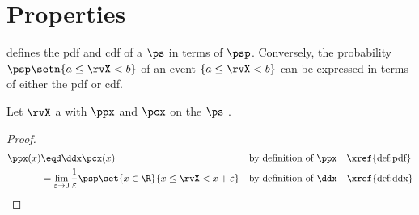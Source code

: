 \section{Properties}
 defines the pdf and cdf of a 
$\ps$ in terms of  $\psp$.
Conversely, the probability  $\psp\setn{a\le\rvX<b}$
of an event $\{a\le\rvX<b\}$ can be
expressed in terms of either the pdf or cdf.

\begin{proposition}
\label{prop:pdfddx}
Let $\rvX$ a  with  $\ppx$ and  $\pcx$
 on the  $\ps$ .\\
\end{proposition}
\begin{proof}
\begin{align*}
  \ppx(x)
    &\eqd \ddx\pcx(x)
    && \text{by definition of $\ppx$}
    && \text{\xref{def:pdf}}
  \\&=    \lim_{\varepsilon\to 0} \frac{1}{\varepsilon}\psp\set{x\in\R}{x \le \rvX < x+\varepsilon}
    && \text{by definition of $\ddx$}
    && \text{\xref{def:ddx}}
\end{align*}
\end{proof}

